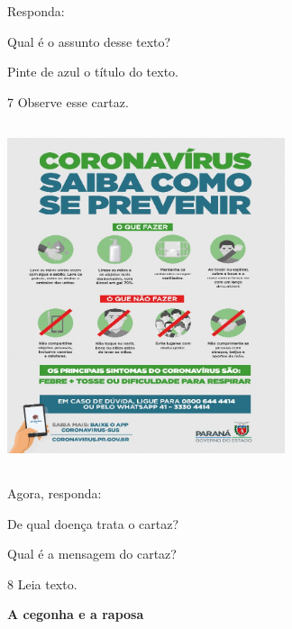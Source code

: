 Responda:

\begin{escolha}
\item Qual é o assunto desse texto?


\item Pinte de azul o título do texto.
\end{escolha}

\num{7} Observe esse cartaz.


\includegraphics[width=3.20896in,height=3.98057in]{media/image120.jpeg}


Agora, responda:

\begin{escolha}
\item De qual doença trata o cartaz?


\item Qual é a mensagem do cartaz?

\end{escolha}

\num{8} Leia texto.

\textbf{A cegonha e a raposa}

